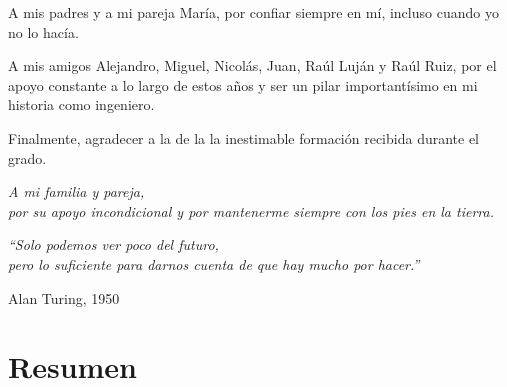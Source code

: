 A mis padres y a mi pareja María, por confiar siempre en mí, incluso cuando yo no lo
hacía.


A mis amigos Alejandro, Miguel, Nicolás, Juan, Raúl Luján y Raúl Ruiz, por el apoyo
constante a lo largo de estos años y ser un pilar importantísimo en mi historia
como ingeniero.

Finalmente, agradecer a la \EPSfacultad{} de la \EPSuniversidad{} la inestimable
formación recibida durante el grado.

\cleardoublepage

\thispagestyle{empty}
\null\vfill
\begin{flushright}
  \itshape
  A mi familia y pareja,\\
  por su apoyo incondicional y por mantenerme siempre con los pies en la tierra.
\end{flushright}
\vfill
\cleardoublepage

\thispagestyle{empty}
\null\vfill
\begin{flushright}
  \itshape
  ``Solo podemos ver poco del futuro,\\ 
  pero lo suficiente para darnos cuenta de que hay mucho por hacer.''
  \par\bigskip
  \normalfont\small Alan Turing, 1950
\end{flushright}
\vfill
\cleardoublepage

\chapter*{Resumen}

